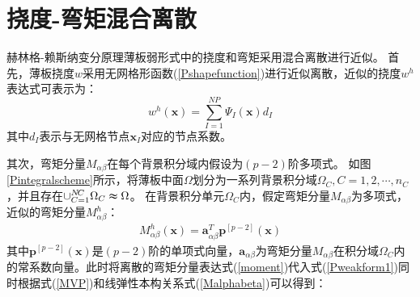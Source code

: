 \section{挠度-弯矩混合离散}
赫林格-赖斯纳变分原理薄板弱形式中的挠度和弯矩采用混合离散进行近似。
首先，薄板挠度$w$采用无网格形函数(\ref{Pshapefunction})进行近似离散，近似的挠度$w^h$表达式可表示为：
\begin{equation}\label{w}
    w^h(\pmb{x})=\sum_{I=1}^{N\!P}\Psi_I(\pmb{x})d_{I}
\end{equation}
其中$d_I$表示与无网格节点$\pmb{x}_I$对应的节点系数。\par
其次，弯矩分量$M_{\alpha\beta}$在每个背景积分域内假设为$(p-2)$阶多项式。
如图\ref{Pintegralscheme}所示，将薄板中面$\Omega$划分为一系列背景积分域$\Omega_C,C=1,2,\dotsb,n_C$，并且存在$\cup_{C=1}^{N\!C}\Omega_C\thickapprox\Omega$。
在背景积分单元$\Omega_C$内，假定弯矩分量$M_{\alpha\beta}$为多项式，近似的弯矩分量$M_{\alpha\beta}^h$：
\begin{equation}\label{moment}
\begin{split}
    M^h_{\alpha\beta}(\pmb{x})=\pmb{a}_{\alpha\beta}^T\pmb{p}^{[p-2]}(\pmb{x})
\end{split}
\end{equation}
其中$\pmb{p}^{[p-2]}(\pmb x)$是$(p-2)$阶的单项式向量，$\pmb{a}_{\alpha\beta}$为弯矩分量$M_{\alpha\beta}$在积分域$\Omega_C$内的常系数向量。此时将离散的弯矩分量表达式(\ref{moment})代入式(\ref{Pweakform1})同时根据式(\ref{MVP})和线弹性本构关系式(\ref{Malphabeta})可以得到：
\newpage
